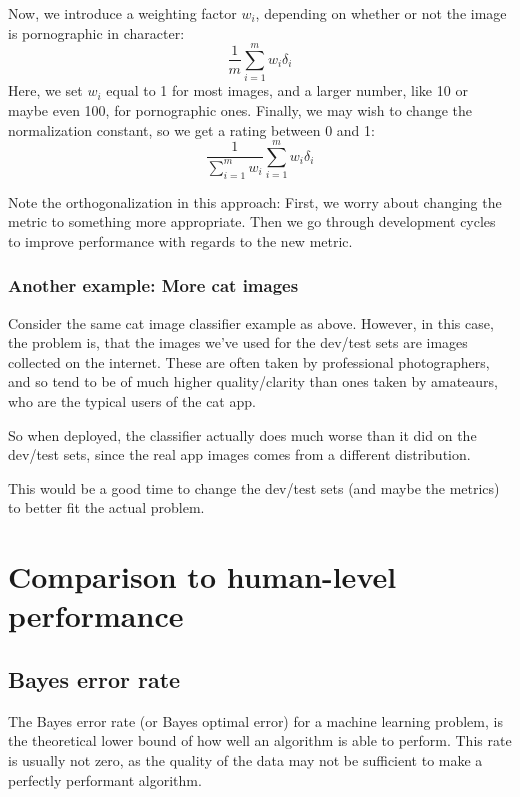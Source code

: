 \documentclass[12pt, a4paper]{article}
\numberwithin{equation}{section}
\begin{document}
Now, we introduce a weighting factor $w_i$, depending on whether or not the image is pornographic in character:
\begin{equation}
\label{new_metric1}
\frac{1}{m}\sum_{i=1}^m w_i\delta_i
\end{equation}
Here, we set $w_i$ equal to 1 for most images, and a larger number, like 10 or maybe even 100, for pornographic ones. Finally, we may wish to change the normalization constant, so we get a rating between 0 and 1:
\begin{equation}
\label{new_metric2}
\frac{1}{\sum_{i=1}^m w_i}\sum_{i=1}^m w_i\delta_i
\end{equation}

Note the orthogonalization in this approach: First, we worry about changing the metric to something more appropriate. Then we go through development cycles to improve performance with regards to the new metric.

\subsubsection{Another example: More cat images}
Consider the same cat image classifier example as above. However, in this case, the problem is, that the images we've used for the dev/test sets are images collected on the internet. These are often taken by professional photographers, and so tend to be of much higher quality/clarity than ones taken by amateaurs, who are the typical users of the cat app.

So when deployed, the classifier actually does much worse than it did on the dev/test sets, since the real app images comes from a different distribution.

This would be a good time to change the dev/test sets (and maybe the metrics) to better fit the actual problem.

\section{Comparison to human-level performance}

\subsection{Bayes error rate}
The Bayes error rate (or Bayes optimal error) for a machine learning problem, is the theoretical lower bound of how well an algorithm is able to perform. This rate is usually not zero, as the quality of the data may not be sufficient to make a perfectly performant algorithm.
\end{document}
